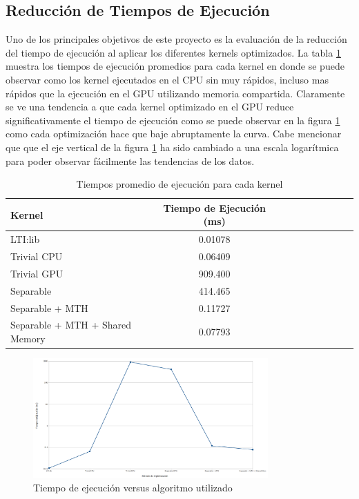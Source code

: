 \documentclass[conference]{IEEEtran}
\begin{document}
\subsection{\textbf{Reducción de Tiempos de Ejecución}}
Uno de los principales objetivos de este proyecto es la evaluación de la reducción del tiempo de ejecución al aplicar los diferentes kernels optimizados. La tabla \ref{table_optimizacion_tiempo} muestra los tiempos de ejecución promedios para cada kernel en donde se puede observar como los kernel ejecutados en el CPU sin muy rápidos, incluso mas rápidos que la ejecución en el GPU utilizando memoria compartida. Claramente se ve una tendencia a que cada kernel optimizado en el GPU reduce significativamente el tiempo de ejecución como se puede observar en la figura \ref{time_vs_opt} como cada optimización hace que baje abruptamente la curva. Cabe mencionar que que el eje vertical de la figura \ref{time_vs_opt} ha sido cambiado a una escala logarítmica para poder observar fácilmente las tendencias de los datos.\\


\begin{table}[h]
\caption{Tiempos promedio de ejecución para cada kernel} %
\centering %
\begin{tabular}{l c c rrrrrrr} %
\hline\hline %
Kernel & Tiempo de Ejecución (ms)\\ [0.5ex]
\hline %
LTI:lib & 0.01078\\[0.5ex]
Trivial CPU & 0.06409\\[0.5ex]
Trivial GPU & 909.400\\[0.5ex]
Separable & 414.465\\ [0.5ex]%
Separable + MTH & 0.11727\\[0.5ex]
Separable + MTH + Shared Memory & 0.07793\\[0.5ex]
\hline %
\end{tabular}
\label{table_optimizacion_tiempo}
\end{table}

\begin{figure}[H]
\centering
\includegraphics[width=9cm]{time_vs_opt}
\caption{Tiempo de ejecución versus algoritmo utilizado}
\label{time_vs_opt}
\end{figure}
\end{document}
